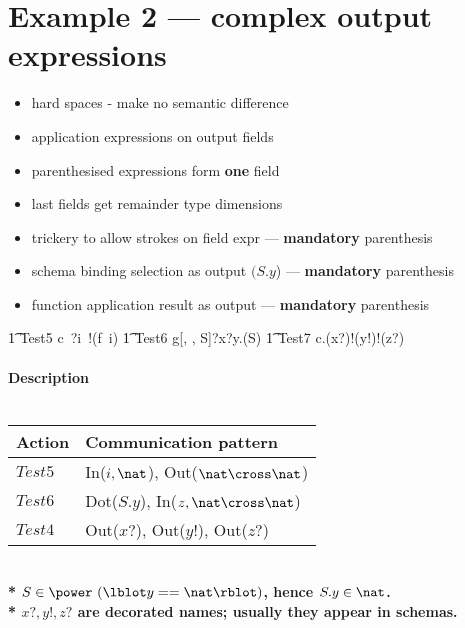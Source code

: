 \documentclass{article}
\begin{document}
\newpage
\section{Example 2 --- complex output expressions}

\begin{itemize}
   \item hard spaces - make no semantic difference
   \item application expressions on output fields
   \item parenthesised expressions form \textbf{one} field
   \item last fields get remainder type dimensions
   \item trickery to allow strokes on field expr --- \textbf{mandatory} parenthesis
   \item schema binding selection as output $(S.y$) --- \textbf{mandatory} parenthesis
   \item function application result as output --- \textbf{mandatory} parenthesis
\end{itemize}

\begin{circusaction}
   \t1 Test5 \circdef c~?i~!(f~i) \then \Skip
       \also
   \t1 Test6 \circdef g[\nat, \nat, S]?x?y.(\theta S) \then \Skip
       \also
   \t1 Test7 \circdef c.(x?)!(y!)!(z?) \then \Skip
\end{circusaction}

\paragraph{Description \\ \\}

\vspace{2pt}
\begin{tabular}{l|l}
   \hline
   Action   & Communication pattern \\
   \hline
   $Test5$  & In($i, \nat$), Out($\nat \cross \nat$) \\
   \hline
   $Test6$  & Dot($S.y$), In($z, \nat \cross \nat$) \\
   \hline
   $Test4$  & Out($x?$), Out($y!$), Out($z?$) \\
   \hline
\end{tabular}
\\

\textbf{* $S \in \power~(\lblot y == \nat \rblot)$, hence $S.y \in \nat$.}
\\
\indent \textbf{* $x?, y!, z?$ are decorated names; usually they appear in schemas.}
\end{document}
